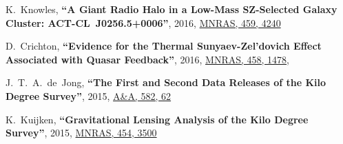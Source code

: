 \documentclass{article}
\def\myself{\textbf{\color{red} C.~Sif\'on}}
\def\aap{A\&A}
\def\mnras{MNRAS}
\newcommand{\paper}[1]{\textbf{``#1''}}
\begin{document}
\begin{etaremune}
\item
K.~Knowles, 
\paper{A Giant Radio Halo in a Low-Mass SZ-Selected Galaxy Cluster: ACT-CL~J0256.5+0006},
2016, \href{http://adsabs.harvard.edu/adsabs/abs/2016MNRAS.459.4240K}{\mnras, 459, 4240}

\item
D.~Crichton, 
\paper{Evidence for the Thermal Sunyaev-Zel'dovich Effect Associated with Quasar Feedback},
2016, \href{http://adsabs.harvard.edu/abs/2016MNRAS.458.1478C}{\mnras, 458, 1478},

\item
J.~T.~A.~de~Jong, 
\paper{The First and Second Data Releases of the Kilo Degree Survey},
2015, \href{http://adsabs.harvard.edu/abs/2015A&A...582A..62D}{\aap, 582, 62}

\item
K.~Kuijken, 
\paper{Gravitational Lensing Analysis of the Kilo Degree Survey},
2015, \href{http://adsabs.harvard.edu/abs/2015MNRAS.454.3500K}{\mnras, 454, 3500}


\end{etaremune}
\end{document}
